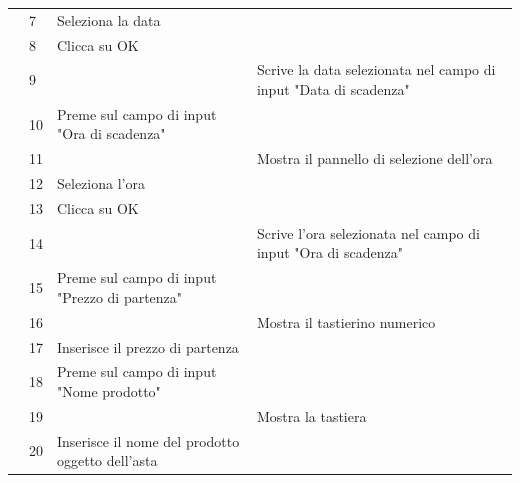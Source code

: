\begin{longtable}{|C{3.0cm}|C{1.3cm}|L{5.2cm}|L{5.2cm}|}
                        & 7
                        & Seleziona la data
                        & \\
                        & 8
                        & Clicca su OK
                        & \\
                        & 9
                        & 
                        & Scrive la data selezionata nel campo di input "Data di scadenza"\\
                        & 10
                        & Preme sul campo di input "Ora di scadenza"
                        & \\
                        & 11
                        & 
                        & Mostra il pannello di selezione dell'ora\\
                        & 12
                        & Seleziona l'ora
                        & \\
                        & 13
                        & Clicca su OK
                        & \\
                        & 14
                        & 
                        & Scrive l'ora selezionata nel campo di input "Ora di scadenza"\\
                        & 15
                        & Preme sul campo di input "Prezzo di partenza"
                        & \\
                        & 16
                        &
                        & Mostra il tastierino numerico \\
                        & 17
                        & Inserisce il prezzo di partenza
                        & \\
                        & 18
                        & Preme sul campo di input "Nome prodotto"
                        & \\
                        & 19
                        &
                        & Mostra la tastiera \\
                        & 20
                        & Inserisce il nome del prodotto oggetto dell'asta
                        & \\

\end{longtable}
